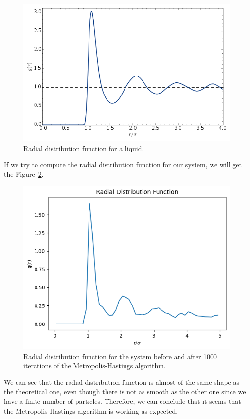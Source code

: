 \documentclass{article}
\begin{document}
\begin{figure}[H]
	\centering
	\includegraphics[width=0.5\linewidth]{./Figures/MCMC/LennardJones/radialdistributionfunction.png}
	\caption{Radial distribution function for a liquid.}
	\label{fig:radialdistributionfunction}
\end{figure}

If we try to compute the radial distribution function for our system, we will get the Figure~\ref{fig:radialdistributionfunctionmh}.

\begin{figure}[H]
	\centering
	\includegraphics[width=0.52\linewidth]{./Figures/MCMC/LennardJones/rdf_exp.png}
	\caption{Radial distribution function for the system before and after 1000 iterations of the Metropolis-Hastings algorithm.}
	\label{fig:radialdistributionfunctionmh}
\end{figure}

We can see that the radial distribution function is almost of the same shape as the theoretical one, even though there is not as smooth as the other one since we have a finite number of particles. Therefore, we can conclude that it seems that the Metropolis-Hastings algorithm is working as expected.

\newpage



\end{document}
